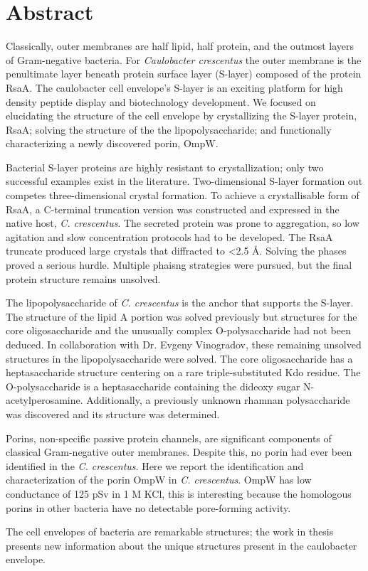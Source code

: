 
\chapter{Abstract}

Classically, outer membranes are half lipid, half protein, and the outmost layers of Gram-negative bacteria. For \textit{Caulobacter crescentus} the outer membrane is the penultimate layer beneath protein surface layer (S-layer) composed of the protein RsaA. The caulobacter cell envelope's S-layer is an exciting platform for high density peptide display and biotechnology development. We focused on elucidating the structure of the cell envelope by crystallizing the S-layer protein, RsaA; solving the structure of the the lipopolysaccharide; and functionally characterizing a newly discovered porin, OmpW. 

Bacterial S-layer proteins are highly resistant to crystallization; only two successful examples exist in the literature. Two-dimensional S-layer formation out competes three-dimensional crystal formation. To achieve a crystallisable form of RsaA, a C-terminal truncation version was constructed and expressed in the native host, \textit{C. crescentus}. The secreted protein was prone to aggregation, so low agitation and slow concentration protocols had to be developed. The RsaA truncate produced large crystals that diffracted to <2.5 \AA. Solving the phases proved a serious hurdle. Multiple phaisng strategies were pursued, but the final protein structure remains unsolved.

The lipopolysaccharide of \textit{C. crescentus} is the anchor that supports the S-layer. The structure of the lipid A portion was solved previously but  structures for the core oligosaccharide and the unusually complex O-polysaccharide had not been deduced. In collaboration with Dr. Evgeny Vinogradov, these remaining unsolved structures in the lipopolysaccharide were solved. The core oligosaccharide has a heptasaccharide structure centering on a rare triple-substituted Kdo residue. The O-polysaccharide is a heptasaccharide containing the dideoxy sugar N-acetylperosamine. Additionally, a previously unknown rhamnan polysaccharide was discovered and its structure was determined. 

Porins, non-specific passive protein channels, are significant components of classical Gram-negative outer membranes. Despite this, no porin had ever been identified in the \textit{C. crescentus}. Here we report the identification and characterization of the porin OmpW in \textit{C. crescentus}.  OmpW has low conductance of 125 pSv in 1 M KCl, this is interesting because the homologous porins in other bacteria have no detectable pore-forming activity.

The cell envelopes of bacteria are remarkable structures; the work in thesis presents new information about the unique structures present in the caulobacter envelope. 
